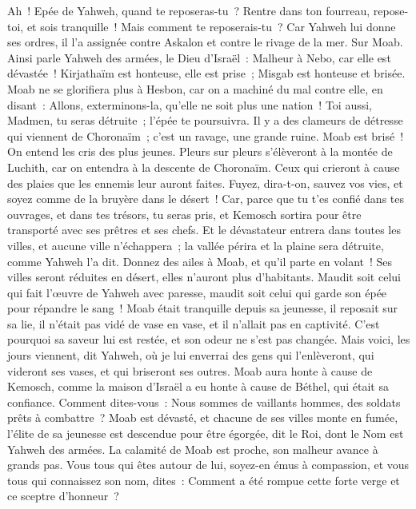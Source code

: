 \begin{multicols}{2}
Ah~! Epée de Yahweh, quand te reposeras-tu~? Rentre dans ton fourreau, repose-toi, et sois tranquille~!
Mais comment te reposerais-tu~? Car Yahweh lui donne ses ordres, il l'a assignée contre Askalon et contre le rivage de la mer.
\VerseOne{}Sur Moab. Ainsi parle Yahweh des armées, le Dieu d'Israël~: Malheur à Nebo, car elle est dévastée~! Kirjathaïm est honteuse, elle est prise~; Misgab est honteuse et brisée.
Moab ne se glorifiera plus à Hesbon, car on a machiné du mal contre elle, en disant~: Allons, exterminons-la, qu'elle ne soit plus une nation~! Toi aussi, Madmen, tu seras détruite~; l'épée te poursuivra.
Il y a des clameurs de détresse qui viennent de Choronaïm~; c'est un ravage, une grande ruine.
Moab est brisé~! On entend les cris des plus jeunes.
Pleurs sur pleurs s'élèveront à la montée de Luchith, car on entendra à la descente de Choronaïm. Ceux qui crieront à cause des plaies que les ennemis leur auront faites.
Fuyez, dira-t-on, sauvez vos vies, et soyez comme de la bruyère dans le désert~!
Car, parce que tu t'es confié dans tes ouvrages, et dans tes trésors, tu seras pris, et Kemosch sortira pour être transporté avec ses prêtres et ses chefs.
Et le dévastateur entrera dans toutes les villes, et aucune ville n'échappera~; la vallée périra et la plaine sera détruite, comme Yahweh l'a dit.
Donnez des ailes à Moab, et qu'il parte en volant~! Ses villes seront réduites en désert, elles n'auront plus d'habitants.
Maudit soit celui qui fait l'œuvre de Yahweh avec paresse, maudit soit celui qui garde son épée pour répandre le sang~!
Moab était tranquille depuis sa jeunesse, il reposait sur sa lie, il n'était pas vidé de vase en vase, et il n'allait pas en captivité. C'est pourquoi sa saveur lui est restée, et son odeur ne s'est pas changée.
Mais voici, les jours viennent, dit Yahweh, où je lui enverrai des gens qui l'enlèveront, qui videront ses vases, et qui briseront ses outres.
Moab aura honte à cause de Kemosch, comme la maison d'Israël a eu honte à cause de Béthel, qui était sa confiance.
Comment dites-vous~: Nous sommes de vaillants hommes, des soldats prêts à combattre~?
Moab est dévasté, et chacune de ses villes monte en fumée, l'élite de sa jeunesse est descendue pour être égorgée, dit le Roi, dont le Nom est Yahweh des armées.
La calamité de Moab est proche, son malheur avance à grands pas.
Vous tous qui êtes autour de lui, soyez-en émus à compassion, et vous tous qui connaissez son nom, dites~: Comment a été rompue cette forte verge et ce sceptre d'honneur~? 

\end{multicols}
